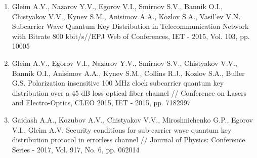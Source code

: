 \begin{enumerate}
\item    Gleim A.V., Nazarov Y.V., Egorov V.I., Smirnov S.V., Bannik O.I., Chistyakov V.V., Kynev S.M., Anisimov A.A., Kozlov S.A., Vasil'ev V.N. Subcarrier Wave Quantum Key Distribution in Telecommunication Network with Bitrate 800 kbit/s//EPJ Web of Conferences, IET - 2015, Vol. 103, pp. 10005
\\
\item    Gleim A.V., Egorov V.I., Nazarov Y.V., Smirnov S.V., Chistyakov V.V., Bannik O.I., Anisimov A.A., Kynev S.M., Collins R.J., Kozlov S.A., Buller G.S. Polarization insensitive 100 MHz clock subcarrier quantum key distribution over a 45 dB loss optical fiber channel // Conference on Lasers and Electro-Optics, CLEO 2015, IET - 2015, pp. 7182997
\\
\item Gaidash A.A., Kozubov A.V., Chistyakov V.V., Miroshnichenko G.P., Egorov V.I., Gleim A.V. Security conditions for sub-carrier wave quantum key distribution protocol in errorless channel // Journal of Physics: Conference Series - 2017, Vol. 917, No. 6, pp. 062014
\\
\\

\end{enumerate}
